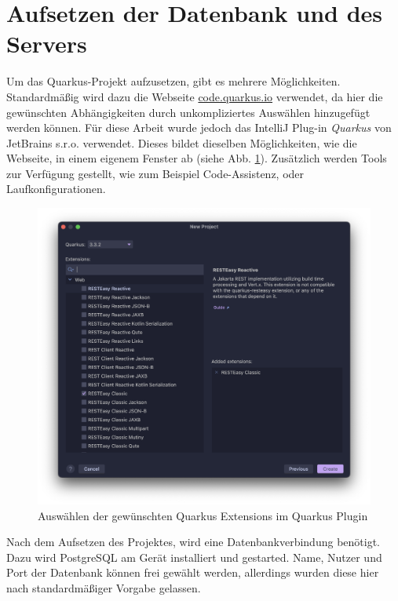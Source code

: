 \section{Aufsetzen der Datenbank und des Servers}

Um das Quarkus-Projekt aufzusetzen, gibt es mehrere Möglichkeiten. 
Standardmäßig wird dazu die Webseite \href{https://code.quarkus.io}{code.quarkus.io} verwendet, da hier die gewünschten Abhängigkeiten durch unkompliziertes Auswählen hinzugefügt werden können. 
Für diese Arbeit wurde jedoch das IntelliJ Plug-in \emph{Quarkus} von JetBrains s.r.o. verwendet. 
Dieses bildet dieselben Möglichkeiten, wie die Webseite, in einem eigenem Fenster ab (siehe Abb. \ref{fig:intellij:plugin}).
Zusätzlich werden Tools zur Verfügung gestellt, wie zum Beispiel Code-Assistenz, oder Laufkonfigurationen. \cite{QuarkusPlugin}

\begin{figure}
    \centering
    \includegraphics[scale=0.4]{pics/quarkusplugin.png}
    \caption{Auswählen der gewünschten Quarkus Extensions im Quarkus Plugin}
    \label{fig:intellij:plugin}
\end{figure}

Nach dem Aufsetzen des Projektes, wird eine Datenbankverbindung benötigt. 
Dazu wird PostgreSQL am Gerät installiert und gestarted.
Name, Nutzer und Port der Datenbank können frei gewählt werden, allerdings wurden diese hier nach standardmäßiger Vorgabe gelassen.

